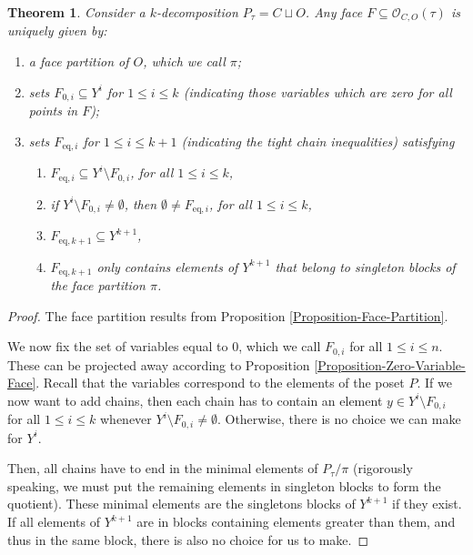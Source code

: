 \documentclass[12pt,a4paper]{amsart}
\newtheorem{theorem}{Theorem}[section]
\theoremstyle{definition}
\newcommand{\OP}{\mathcal{O}}
\newcommand{\Ptau}{P_\tau}
\begin{document}
\begin{theorem}\label{Theorem-ChainOrder-Normal}
  Consider a $k$-decomposition $P_\tau=C\sqcup O$.
  Any face $F\subseteq\OP_{C,O}(\tau)$ is uniquely given by:
\begin{enumerate}
\item{a face partition of $O$, which we call $\pi$};
\item{sets $F_{0,i}\subseteq Y^i$ for $1\leq i\leq k$ (indicating those variables which are zero for all points in $F$);}
  \item\label{thm:chainorder-chain-cond}{
      sets $F_{\mathrm{eq},i}$ for $1\leq i\leq k+1$ (indicating the tight chain inequalities) satisfying
      \begin{enumerate}
      \item{
          $F_{\mathrm{eq},i}\subseteq Y^{i}\setminus F_{0,i}$, for all $1\leq i\leq k$,
        }
      \item{
          if $Y^{{i}}\setminus F_{0,i}\neq\emptyset$, then $\emptyset\neq F_{\mathrm{eq},i}$, for all $1\leq i\leq k$,
        }
      \item{
          $F_{\mathrm{eq},k+1}\subseteq Y^{k+1}$,
        }
      \item{
          $F_{\mathrm{eq},k+1}$ only contains elements of $Y^{k+1}$ that belong to singleton blocks of the face partition $\pi$.
        }
      \end{enumerate}
    }
  \end{enumerate}
\end{theorem}
\begin{proof}
The face partition results from Proposition \ref{Proposition-Face-Partition}.

We now fix the set of variables equal to $0$, which we call $F_{0,i}$ for all $1\leq i\leq n$.
These can be projected away according to Proposition \ref{Proposition-Zero-Variable-Face}.
Recall that the variables correspond to the elements of the poset $P$.
If we now want to add chains, then each chain has to contain an element $y\in Y^{{i}}\setminus F_{0,i}$ for all $1\leq i\leq k$ whenever $Y^{{i}}\setminus F_{0,i}\neq\emptyset$.
Otherwise, there is no choice we can make for $Y^{{i}}$.

Then, all chains have to end in the minimal elements of $\Ptau/\pi$ (rigorously speaking, we must put the remaining elements in singleton blocks to form the quotient). 
These minimal elements are the singletons blocks of $Y^{{k+1}}$ if they exist. 
If all elements of $Y^{{k+1}}$ are in blocks containing elements greater than them, and thus in the same block, there is also no choice for us to make.
\end{proof}
\end{document}
